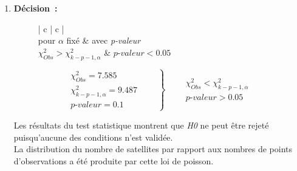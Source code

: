 \begin{enumerate}
    \item \textbf{Décision~:}
        \begin{figure}[!h]
            \centering
            \begin{minipage}{.48\linewidth}
                \begin{center}
                    \begin{tabular}{| c | c |}
                        \hline
                         \\
                        pour $\alpha$ fixé & avec \textit{p-valeur} \\ \hline
                        $\chi^{2}_{Obs} > \chi^{2}_{k-p-1, \alpha}$ & $ \textit{p-valeur} < 0.05 $\\ \hline
                    \end{tabular}
                \end{center}
            \end{minipage}\hfill\vline
            \begin{minipage}{.48\linewidth}
                \begin{equation*}
                    \left .
                    \begin{aligned}
                        \chi^{2}_{Obs} = 7.585 \\
                        \chi^{2}_{k-p-1, \alpha} = 9.487\\
                        \textit{p-valeur} = 0.1
                    \end{aligned} \qquad
                    \right\} \qquad
                    \begin{aligned} 
                        \chi^{2}_{Obs} < \chi^{2}_{k-p-1, \alpha}\\
                        \textit{p-valeur} > 0.05
                    \end{aligned}
                \end{equation*}
            \end{minipage}
        \end{figure}

        Les résultats du test statistique montrent que \textit{H0} ne peut être rejeté puisqu'aucune des conditions n'est validée. \\
        La distribution du nombre de satellites par rapport aux nombres de points d'observations a été produite par cette loi de poisson.
\end{enumerate}


